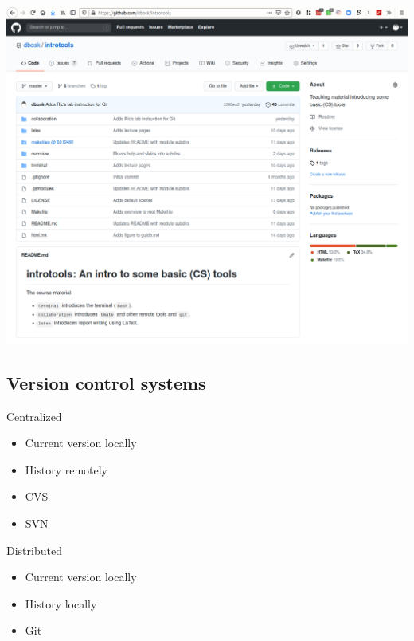 \begin{frame}
  \centering
  \includegraphics[height=\textheight]{figs/github-introtools.png}
\end{frame}

\subsection{Version control systems}

\begin{frame}
  \begin{block}{Centralized}
    \begin{itemize}
      \item Current version locally
      \item History remotely
    \end{itemize}
  \end{block}

  \pause

  \begin{example}
    \begin{itemize}
      \item CVS
      \item SVN
    \end{itemize}
  \end{example}
\end{frame}

\begin{frame}
  \begin{block}{Distributed}
    \begin{itemize}
      \item Current version locally
      \item History locally
    \end{itemize}
  \end{block}

  \pause

  \begin{example}
    \begin{itemize}
      \item Git
    \end{itemize}
  \end{example}
\end{frame}

